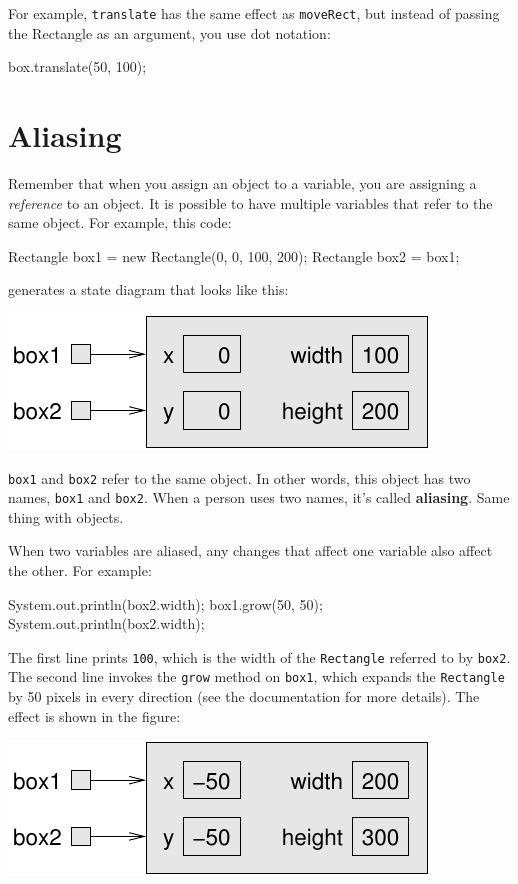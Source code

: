 For example, {\tt translate} has the same effect as {\tt moveRect},
but instead of passing the Rectangle as an argument, you use dot
notation:

\begin{code}
    box.translate(50, 100);
\end{code}
%


\section{Aliasing}
\label{aliasing}

Remember that when you assign an object to a variable, you
are assigning a {\em reference} to an object.  It is possible to have
multiple variables that refer to the same object.  For example,
this code:

\begin{code}
    Rectangle box1 = new Rectangle(0, 0, 100, 200);
    Rectangle box2 = box1;
\end{code}
%
generates a state diagram that looks like this:


\includegraphics{figs/aliasing.pdf}


{\tt box1} and {\tt box2} refer to the same object.
In other words, this object has two names, {\tt box1} and {\tt box2}.
When a person uses two names, it's called {\bf aliasing}.  Same thing
with objects.

When two variables are aliased, any changes that affect one
variable also affect the other.  For example:

\begin{code}
    System.out.println(box2.width);
    box1.grow(50, 50);
    System.out.println(box2.width);
\end{code}
%
The first line prints {\tt 100}, which is the width of the
{\tt Rectangle} referred to by {\tt box2}.  The second
line invokes the {\tt grow} method on {\tt box1}, which
expands the {\tt Rectangle} by 50 pixels in every direction
(see the documentation for more details).  The effect
is shown in the figure:


\includegraphics{figs/aliasing2.pdf}


